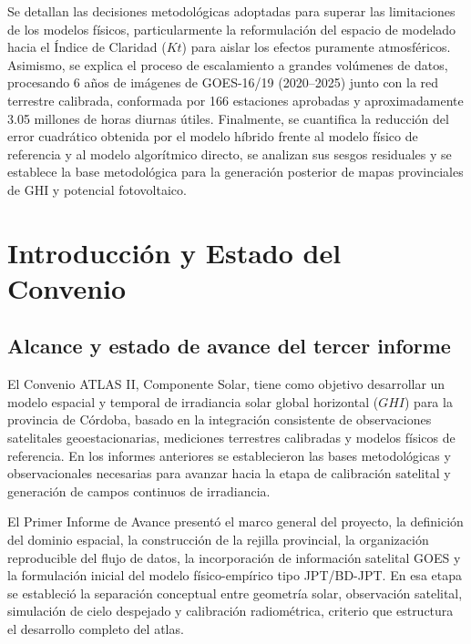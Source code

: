 \documentclass[../main.tex]{subfiles}
\begin{document}
Se detallan las decisiones metodológicas adoptadas para superar las limitaciones de los modelos físicos, particularmente la reformulación del espacio de modelado hacia el Índice de Claridad ($Kt$) para aislar los efectos puramente atmosféricos. Asimismo, se explica el proceso de escalamiento a grandes volúmenes de datos, procesando 6 años de imágenes de GOES-16/19 (2020–2025) junto con la red terrestre calibrada, conformada por 166 estaciones aprobadas y aproximadamente 3.05 millones de horas diurnas útiles. Finalmente, se cuantifica la reducción del error cuadrático obtenida por el modelo híbrido frente al modelo físico de referencia y al modelo algorítmico directo, se analizan sus sesgos residuales y se establece la base metodológica para la generación posterior de mapas provinciales de GHI y potencial fotovoltaico.

\bigskip

\newpage

\tableofcontents

\newpage

\section{Introducción y Estado del Convenio}

\subsection{Alcance y estado de avance del tercer informe}

El Convenio ATLAS II, Componente Solar, tiene como objetivo desarrollar un modelo espacial y temporal de irradiancia solar global horizontal ($GHI$) para la provincia de Córdoba, basado en la integración consistente de observaciones satelitales geoestacionarias, mediciones terrestres calibradas y modelos físicos de referencia. En los informes anteriores se establecieron las bases metodológicas y observacionales necesarias para avanzar hacia la etapa de calibración satelital y generación de campos continuos de irradiancia.

El Primer Informe de Avance presentó el marco general del proyecto, la definición del dominio espacial, la construcción de la rejilla provincial, la organización reproducible del flujo de datos, la incorporación de información satelital GOES y la formulación inicial del modelo físico-empírico tipo JPT/BD-JPT. En esa etapa se estableció la separación conceptual entre geometría solar, observación satelital, simulación de cielo despejado y calibración radiométrica, criterio que estructura el desarrollo completo del atlas.
\end{document}
